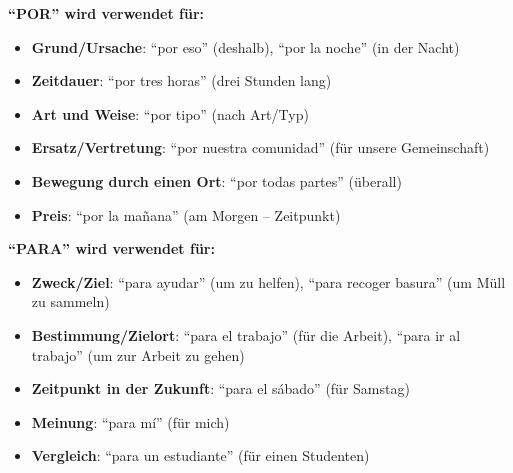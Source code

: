 \documentclass[12pt,a4paper]{article}
\begin{document}
\textbf{\enquote{POR} wird verwendet für:}
\begin{itemize}[leftmargin=*]
    \item \textbf{Grund/Ursache}: \enquote{por eso} (deshalb), \enquote{por la noche} (in der Nacht)
    \item \textbf{Zeitdauer}: \enquote{por tres horas} (drei Stunden lang)
    \item \textbf{Art und Weise}: \enquote{por tipo} (nach Art/Typ)
    \item \textbf{Ersatz/Vertretung}: \enquote{por nuestra comunidad} (für unsere Gemeinschaft)
    \item \textbf{Bewegung durch einen Ort}: \enquote{por todas partes} (überall)
    \item \textbf{Preis}: \enquote{por la mañana} (am Morgen -- Zeitpunkt)
\end{itemize}

\textbf{\enquote{PARA} wird verwendet für:}
\begin{itemize}[leftmargin=*]
    \item \textbf{Zweck/Ziel}: \enquote{para ayudar} (um zu helfen), \enquote{para recoger basura} (um Müll zu sammeln)
    \item \textbf{Bestimmung/Zielort}: \enquote{para el trabajo} (für die Arbeit), \enquote{para ir al trabajo} (um zur Arbeit zu gehen)
    \item \textbf{Zeitpunkt in der Zukunft}: \enquote{para el sábado} (für Samstag)
    \item \textbf{Meinung}: \enquote{para mí} (für mich)
    \item \textbf{Vergleich}: \enquote{para un estudiante} (für einen Studenten)
\end{itemize}
\end{document}
